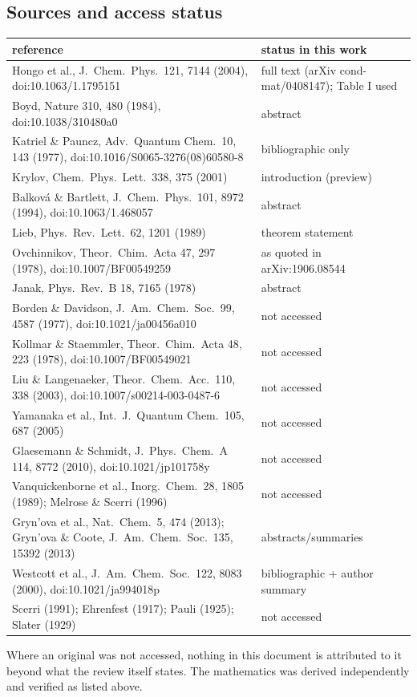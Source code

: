 \subsection{Sources and access status}
\begin{center}
\footnotesize
\begin{tabular}{p{}p{}}
\toprule
reference & status in this work\\
\midrule
Hongo et al., J.\ Chem.\ Phys.\ 121, 7144 (2004), doi:10.1063/1.1795151 & full text (arXiv cond-mat/0408147); Table I used\\
Boyd, Nature 310, 480 (1984), doi:10.1038/310480a0 & abstract\\
Katriel \& Pauncz, Adv.\ Quantum Chem.\ 10, 143 (1977), doi:10.1016/S0065-3276(08)60580-8 & bibliographic only\\
Krylov, Chem.\ Phys.\ Lett.\ 338, 375 (2001) & introduction (preview)\\
Balkov\'a \& Bartlett, J.\ Chem.\ Phys.\ 101, 8972 (1994), doi:10.1063/1.468057 & abstract\\
Lieb, Phys.\ Rev.\ Lett.\ 62, 1201 (1989) & theorem statement\\
Ovchinnikov, Theor.\ Chim.\ Acta 47, 297 (1978), doi:10.1007/BF00549259 & as quoted in arXiv:1906.08544\\
Janak, Phys.\ Rev.\ B 18, 7165 (1978) & abstract\\
Borden \& Davidson, J.\ Am.\ Chem.\ Soc.\ 99, 4587 (1977), doi:10.1021/ja00456a010 & not accessed\\
Kollmar \& Staemmler, Theor.\ Chim.\ Acta 48, 223 (1978), doi:10.1007/BF00549021 & not accessed\\
Liu \& Langenaeker, Theor.\ Chem.\ Acc.\ 110, 338 (2003), doi:10.1007/s00214-003-0487-6 & not accessed\\
Yamanaka et al., Int.\ J.\ Quantum Chem.\ 105, 687 (2005) & not accessed\\
Glaesemann \& Schmidt, J.\ Phys.\ Chem.\ A 114, 8772 (2010), doi:10.1021/jp101758y & not accessed\\
Vanquickenborne et al., Inorg.\ Chem.\ 28, 1805 (1989); Melrose \& Scerri (1996) & not accessed\\
Gryn'ova et al., Nat.\ Chem.\ 5, 474 (2013); Gryn'ova \& Coote, J.\ Am.\ Chem.\ Soc.\ 135, 15392 (2013) & abstracts/summaries\\
Westcott et al., J.\ Am.\ Chem.\ Soc.\ 122, 8083 (2000), doi:10.1021/ja994018p & bibliographic + author summary\\
Scerri (1991); Ehrenfest (1917); Pauli (1925); Slater (1929) & not accessed\\
\bottomrule
\end{tabular}
\end{center}
Where an original was not accessed, nothing in this document is attributed to it beyond what the review
itself states. The mathematics was derived independently and verified as listed above.
